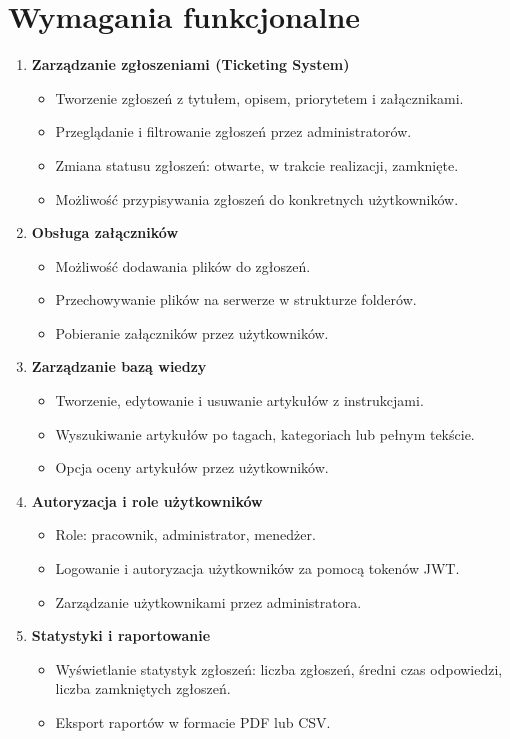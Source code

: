 \documentclass[a4paper,12pt]{article}
\begin{document}
\section{Wymagania funkcjonalne}
\begin{enumerate}
    \item \textbf{Zarządzanie zgłoszeniami (Ticketing System)}
    \begin{itemize}
        \item Tworzenie zgłoszeń z tytułem, opisem, priorytetem i załącznikami.
        \item Przeglądanie i filtrowanie zgłoszeń przez administratorów.
        \item Zmiana statusu zgłoszeń: otwarte, w trakcie realizacji, zamknięte.
        \item Możliwość przypisywania zgłoszeń do konkretnych użytkowników.
    \end{itemize}

    \item \textbf{Obsługa załączników}
    \begin{itemize}
        \item Możliwość dodawania plików do zgłoszeń.
        \item Przechowywanie plików na serwerze w strukturze folderów.
        \item Pobieranie załączników przez użytkowników.
    \end{itemize}

    \item \textbf{Zarządzanie bazą wiedzy}
    \begin{itemize}
        \item Tworzenie, edytowanie i usuwanie artykułów z instrukcjami.
        \item Wyszukiwanie artykułów po tagach, kategoriach lub pełnym tekście.
        \item Opcja oceny artykułów przez użytkowników.
    \end{itemize}

    \item \textbf{Autoryzacja i role użytkowników}
    \begin{itemize}
        \item Role: pracownik, administrator, menedżer.
        \item Logowanie i autoryzacja użytkowników za pomocą tokenów JWT.
        \item Zarządzanie użytkownikami przez administratora.
    \end{itemize}

    \item \textbf{Statystyki i raportowanie}
    \begin{itemize}
        \item Wyświetlanie statystyk zgłoszeń: liczba zgłoszeń, średni czas odpowiedzi, liczba zamkniętych zgłoszeń.
        \item Eksport raportów w formacie PDF lub CSV.
    \end{itemize}
\end{enumerate}
\end{document}
